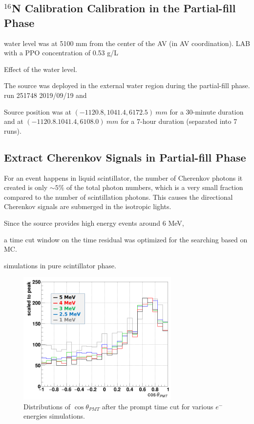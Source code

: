 \subsection{$^{16}$N Calibration Calibration in the Partial-fill Phase}

water level was at 5100 mm from the center of the AV (in AV coordination).
LAB with a PPO concentration of 0.53 g/L  

Effect of the water level.



The  source was deployed in the external water region during the partial-fill phase.
run 251748 2019/09/19 and 

Source position was at $(-1120.8, 1041.4, 6172.5)~ mm$ for a 30-minute duration and at $(-1120.8. 1041.4, 6108.0)~mm$ for a 7-hour duration (separated into 7 runs).





\subsection{Extract Cherenkov Signals in Partial-fill Phase}

For an event happens in liquid scintillator, the number of Cherenkov photons it created is only $\sim 5\%$ 
of the total photon numbers, which is a very small fraction compared to the number of scintillation photons. This causes the directional Cherenkov signals are submerged in the isotropic lights.

Since the  source provides high energy events around 6 MeV, 






a time cut window on the time residual was optimized for the searching based on MC.

simulations in pure scintillator phase.











 
\begin{figure}[!htb]
	\centering
	\includegraphics[width=8cm]{cherenkov_scint_variousE.png}
	\caption{Distributions of $\cos\theta_{PMT}$ after the prompt time cut for various $e^-$ energies simulations.}
	\label{cherenkov_variousE}
\end{figure}


